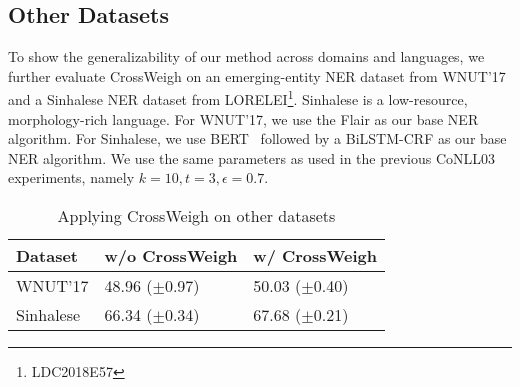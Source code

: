 \documentclass[11pt,a4paper]{article}
\newcommand{\our}{\mbox{\sf CrossWeigh}\xspace}
\begin{document}
        
    \subsection{Other Datasets}
        To show the generalizability of our method across domains and languages, we further evaluate \our on an emerging-entity NER dataset from WNUT'17 and a Sinhalese NER dataset from LORELEI\footnote{LDC2018E57}.
        Sinhalese is a low-resource, morphology-rich language.
        For WNUT'17, we use the Flair as our base NER algorithm. For Sinhalese, we use BERT~\cite{devlin2018bert} followed by a BiLSTM-CRF as our base NER algorithm. 
        We use the same parameters as used in the previous CoNLL03 experiments, namely $k = 10, t = 3, \epsilon = 0.7$. 
        
\begin{table}[t]
\center
\small
\begin{tabularx}{1\linewidth}{l *{2}{Y}}
\toprule   \textbf{Dataset}        & \textbf{w/o CrossWeigh} & \textbf{w/ CrossWeigh}\\

\midrule
 WNUT'17 & 48.96 ($\pm$0.97) & 50.03 ($\pm$0.40)  \\
 \midrule
 Sinhalese & 66.34 ($\pm$0.34) & 67.68 ($\pm$0.21)  \\


\bottomrule
\end{tabularx}
\vspace{-0.15cm}
\caption{Applying CrossWeigh on other datasets}
\label{tbl:other}
\vspace{-0.3cm}
\end{table}
\end{document}
